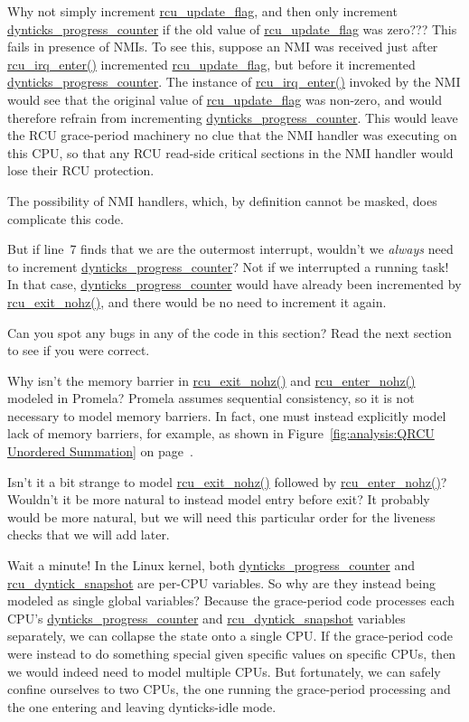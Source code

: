 \QuickQ{}
	Why not simply increment \url{rcu_update_flag}, and then only
	increment \url{dynticks_progress_counter} if the old value
	of \url{rcu_update_flag} was zero???
\QuickA{}
	This fails in presence of NMIs.
	To see this, suppose an NMI was received just after
	\url{rcu_irq_enter()} incremented \url{rcu_update_flag},
	but before it incremented \url{dynticks_progress_counter}.
	The instance of \url{rcu_irq_enter()} invoked by the NMI
	would see that the original value of \url{rcu_update_flag}
	was non-zero, and would therefore refrain from incrementing
	\url{dynticks_progress_counter}.
	This would leave the RCU grace-period machinery no clue that the
	NMI handler was executing on this CPU, so that any RCU read-side
	critical sections in the NMI handler would lose their RCU protection.

	The possibility of NMI handlers, which, by definition cannot
	be masked, does complicate this code.

\QuickQ{}
	But if line~7 finds that we are the outermost interrupt,
	wouldn't we \emph{always} need to increment
	\url{dynticks_progress_counter}?
\QuickA{}
	Not if we interrupted a running task!
	In that case, \url{dynticks_progress_counter} would
	have already been incremented by \url{rcu_exit_nohz()},
	and there would be no need to increment it again.

\QuickQ{}
	Can you spot any bugs in any of the code in this section?
\QuickA{}
	Read the next section to see if you were correct.

\QuickQ{}
	Why isn't the memory barrier in \url{rcu_exit_nohz()}
	and \url{rcu_enter_nohz()} modeled in Promela?
\QuickA{}
	Promela assumes sequential consistency, so
	it is not necessary to model memory barriers.
	In fact, one must instead explicitly model lack of memory barriers,
	for example, as shown in
	Figure~\ref{fig:analysis:QRCU Unordered Summation} on
	page~\pageref{fig:analysis:QRCU Unordered Summation}.

\QuickQ{}
	Isn't it a bit strange to model \url{rcu_exit_nohz()}
	followed by \url{rcu_enter_nohz()}?
	Wouldn't it be more natural to instead model entry before exit?
\QuickA{}
	It probably would be more natural, but we will need
	this particular order for the liveness checks that we will add later.

\QuickQ{}
	Wait a minute!
	In the Linux kernel, both \url{dynticks_progress_counter} and
	\url{rcu_dyntick_snapshot} are per-CPU variables.
	So why are they instead being modeled as single global variables?
\QuickA{}
	Because the grace-period code processes each
	CPU's \url{dynticks_progress_counter} and
	\url{rcu_dyntick_snapshot} variables separately,
	we can collapse the state onto a single CPU.
	If the grace-period code were instead to do something special
	given specific values on specific CPUs, then we would indeed need
	to model multiple CPUs.
	But fortunately, we can safely confine ourselves to two CPUs, the
	one running the grace-period processing and the one entering and
	leaving dynticks-idle mode.

